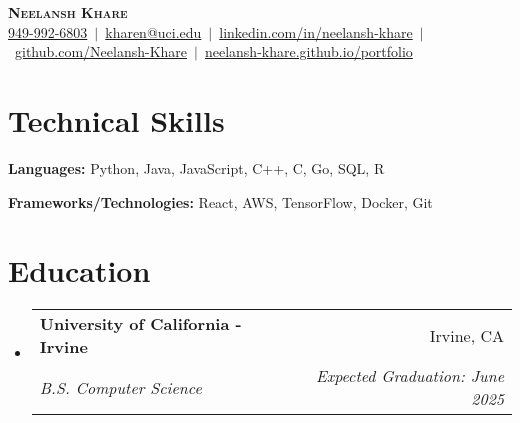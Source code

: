 \documentclass[letterpaper,11pt]{article}
\makeatletter
\newcommand{\resumeSubheading}[4]{
  \vspace{-2pt}\item
    \begin{tabular*}{0.97\textwidth}[t]{l@{\extracolsep{\fill}}r}
      \textbf{#1} & #2 \\
      \textit{\small#3} & \textit{\small #4} \\
    \end{tabular*}\vspace{-5pt}
}
\newcommand{\resumeSubHeadingListStart}{\begin{itemize}[leftmargin=0.15in, label={}]}
\newcommand{\resumeSubHeadingListEnd}{\end{itemize}}
\makeatother
\begin{document}
\begin{center}  
  \textbf{\Large \scshape Neelansh Khare} \\ \vspace{1pt}
  \color{blue}
  \small \href{tel:19499926803}{{949-992-6803}}~$|$~\href{mailto:kharen@uci.edu}{{kharen@uci.edu}}~$|$~\href{https://linkedin.com/in/neelansh-khare}{{linkedin.com/in/neelansh-khare}}~$|$~\href{https://github.com/Neelansh-Khare}{{github.com/Neelansh-Khare}}~$|$~\href{https://neelansh-khare.github.io/portfolio/}{{neelansh-khare.github.io/portfolio}}
\end{center}

\section{Technical Skills}
\begin{itemize}[leftmargin=0.15in, label={}, itemsep=0pt]
\small{\item{
 \textbf{Languages:} Python, Java, JavaScript, C++, C, Go, SQL, R
}}
\small{\item{
 \textbf{Frameworks/Technologies:} React, AWS, TensorFlow, Docker, Git
}}
\end{itemize}

\section{Education}
  \resumeSubHeadingListStart
    \resumeSubheading
      {University of California - Irvine}{Irvine, CA}
      {B.S. Computer Science}{Expected Graduation: June 2025}
  \resumeSubHeadingListEnd
  
\end{document}
